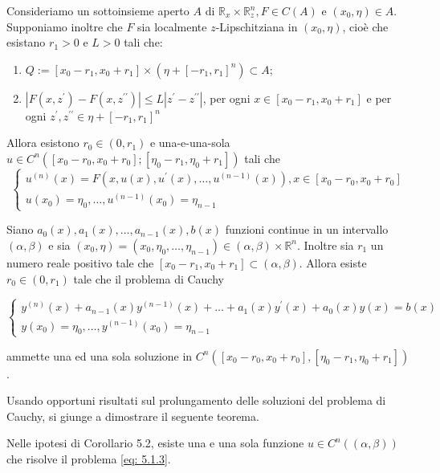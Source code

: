 \begin{corollary}[$*$]\label{cor: 5.1}
    
    Consideriamo un sottoinsieme aperto $A$ di $\mathbb{R}_{x} \times \mathbb{R}_{z}^{n}, F \in C(A)$ e $\left(x_{0}, \eta\right) \in A$. Supponiamo inoltre che $F$ sia localmente $z$-Lipschitziana in $\left(x_{0}, \eta\right)$, cioè che esistano $r_{1}>0$ e $L>0$ tali che:
    \begin{enumerate}[i]
        \item  $Q:=\left[x_{0}-r_{1}, x_{0}+r_{1}\right] \times\left(\eta+\left[-r_{1}, r_{1}\right]^{n}\right) \subset A$;
        \item $\left|F\left(x, z^{\prime}\right)-F\left(x, z^{\prime \prime}\right)\right| \leq L\left|z^{\prime}-z^{\prime \prime}\right|$, per ogni $x \in\left[x_{0}-r_{1}, x_{0}+r_{1}\right]$ e per ogni $z^{\prime}, z^{\prime \prime} \in \eta+\left[-r_{1}, r_{1}\right]^{n}$
    \end{enumerate}
    Allora esistono $r_{0} \in\left(0, r_{1}\right)$ e una-e-una-sola $u \in C^{n}\left(\left[x_{0}-r_{0}, x_{0}+r_{0}\right];\left[\eta_{0}-r_{1}, \eta_{0}+r_{1}\right]\right)$ tali che
    \[\begin{cases}
        u^{(n)}(x)=F\left(x, u(x), u^{\prime}(x), \ldots, u^{(n-1)}(x)\right), x \in\left[x_{0}-r_{0}, x_{0}+r_{0}\right] \\
        u\left(x_{0}\right)=\eta_{0}, \ldots, u^{(n-1)}\left(x_{0}\right)=\eta_{n-1}
    \end{cases}\]
\end{corollary}
\begin{corollary}[$*$]\label{cor: 5.2}
    Siano $a_{0}(x), a_{1}(x), \ldots, a_{n-1}(x), b(x)$ funzioni continue in un intervallo $(\alpha, \beta)$ e sia $\left(x_{0}, \eta\right)=\left(x_{0}, \eta_{0}, \ldots, \eta_{n-1}\right) \in(\alpha, \beta) \times \mathbb{R}^{n}$. Inoltre sia $r_{1}$ un numero reale positivo tale che $\left[x_{0}-r_{1}, x_{0}+r_{1}\right] \subset(\alpha, \beta)$. Allora esiste $r_{0} \in\left(0, r_{1}\right)$ tale che il problema di Cauchy

    \begin{equation}\label{eq: 5.1.3}
    \begin{cases}
    y^{(n)}(x)+a_{n-1}(x) y^{(n-1)}(x)+\ldots+a_{1}(x) y^{\prime}(x)+a_{0}(x) y(x)=b(x)  \\
    y\left(x_{0}\right)=\eta_{0}, \ldots, y^{(n-1)}\left(x_{0}\right)=\eta_{n-1}
    \end{cases}
    \end{equation}
    
    ammette una ed una sola soluzione in $C^{n}\left(\left[x_{0}-r_{0}, x_{0}+r_{0}\right],\left[\eta_{0}-r_{1}, \eta_{0}+r_{1}\right]\right)$.
\end{corollary}
Usando opportuni risultati sul prolungamento delle soluzioni del problema di Cauchy, si giunge a dimostrare il seguente teorema.

\begin{shadedTheorem}
    Nelle ipotesi di Corollario 5.2, esiste una e una sola funzione $u \in C^{n}((\alpha, \beta))$ che risolve il problema \eqref{eq: 5.1.3}.
\end{shadedTheorem}
